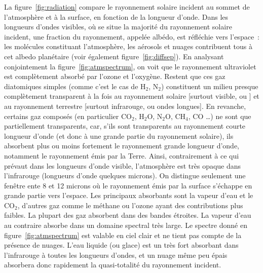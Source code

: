 \sk
La figure~\ref{fig:radiation} compare le rayonnement solaire incident au sommet de l'atmosphère et à la surface, en fonction de la longueur d'onde. Dans les longueurs d'ondes visibles, où se situe la majorité du rayonnement solaire incident, une fraction du rayonnement, appelée albédo, est réfléchie vers l'espace~: les molécules constituant l'atmosphère, les aérosols et nuages contribuent tous à cet albedo planétaire (voir également figure~\ref{fig:diffsep}). En analysant conjointement la figure~\ref{fig:atmspectrum}, on voit que le rayonnement ultraviolet est complètement absorbé par l'ozone et l'oxygène. Restent que ces gaz diatomiques simples (comme c'est le cas de H$_2$, N$_2$) constituent un milieu presque complètement transparent à la fois au rayonnement solaire [surtout visible, ou ] et au rayonnement terrestre [surtout infrarouge, ou ondes longues]. En revanche, certains gaz composés (en particulier CO$_2$, H$_2$O, N$_2$O, CH$_4$, CO \ldots) ne sont que partiellement transparents, car, s'ils sont transparents au rayonnement courte longueur d’onde (et donc à une grande partie du rayonnement solaire), ils absorbent plus ou moins fortement le rayonnement grande longueur d’onde, notamment le rayonnement émis par la Terre. Ainsi, contrairement à ce qui prévaut dans les longueurs d'onde visible, l'atmosphère est très opaque dans l'infrarouge (longueurs d'onde quelques microns). On distingue seulement une fenêtre ente 8 et 12 microns où le rayonnement émis par la surface s'échappe en grande partie vers l'espace. Les principaux absorbants sont la vapeur d'eau et le CO$_2$, d'autres gaz comme le méthane ou l'ozone ayant des contributions plus faibles. La plupart des gaz absorbent dans des bandes étroites. La vapeur d'eau au contraire absorbe dans un domaine spectral très large. Le spectre donné en figure~\ref{fig:atmspectrum} est valable en ciel clair et ne tient pas compte de la présence de nuages. L'eau liquide (ou glace) est un très fort absorbant dans l'infrarouge à toutes les longueurs d'ondes, et un nuage même peu épais absorbera donc rapidement la quasi-totalité du rayonnement incident. 


